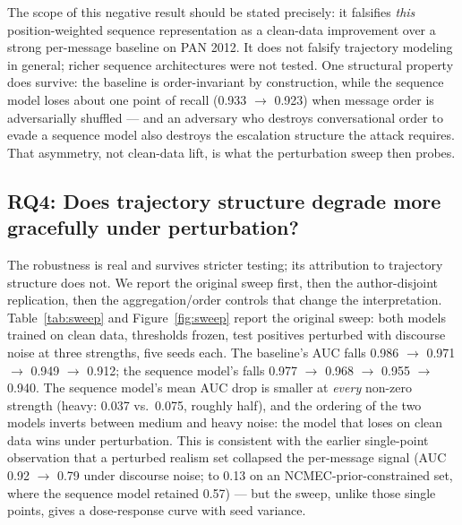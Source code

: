 \documentclass[11pt]{article}
\begin{document}
The scope of this negative result should be stated precisely: it falsifies \emph{this} position-weighted sequence representation as a clean-data improvement over a strong per-message baseline on PAN 2012. It does not falsify trajectory modeling in general; richer sequence architectures were not tested. One structural property does survive: the baseline is order-invariant by construction, while the sequence model loses about one point of recall (0.933 $\to$ 0.923) when message order is adversarially shuffled --- and an adversary who destroys conversational order to evade a sequence model also destroys the escalation structure the attack requires. That asymmetry, not clean-data lift, is what the perturbation sweep then probes.

\subsection{RQ4: Does trajectory structure degrade more gracefully under perturbation?}
\label{sec:rq4}

The robustness is real and survives stricter testing; its attribution to trajectory structure does not. We report the original sweep first, then the author-disjoint replication, then the aggregation/order controls that change the interpretation. Table~\ref{tab:sweep} and Figure~\ref{fig:sweep} report the original sweep: both models trained on clean data, thresholds frozen, test positives perturbed with discourse noise at three strengths, five seeds each. The baseline's AUC falls 0.986 $\to$ 0.971 $\to$ 0.949 $\to$ 0.912; the sequence model's falls 0.977 $\to$ 0.968 $\to$ 0.955 $\to$ 0.940. The sequence model's mean AUC drop is smaller at \emph{every} non-zero strength (heavy: 0.037 vs.\ 0.075, roughly half), and the ordering of the two models inverts between medium and heavy noise: the model that loses on clean data wins under perturbation. This is consistent with the earlier single-point observation that a perturbed realism set collapsed the per-message signal (AUC 0.92 $\to$ 0.79 under discourse noise; to 0.13 on an NCMEC-prior-constrained set, where the sequence model retained 0.57) --- but the sweep, unlike those single points, gives a dose-response curve with seed variance.

\begin{table}[!htbp]
\centering
\footnotesize

\caption{Perturbation sweep on PAN 2012 (stratified conversation-level split; 5 seeds per non-zero strength; mean AUC $\pm$ across-seed std; drop is relative to the clean condition). Discourse-noise family: truncation, benign-message swap, message drop, order jitter, applied to test positives only. Source: \texttt{perturbation\_sweep.json}.}
\label{tab:sweep}
\end{table}
\end{document}
